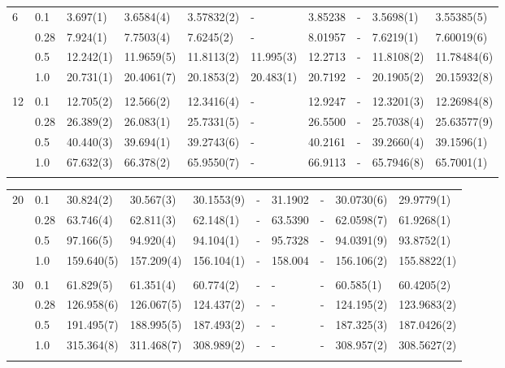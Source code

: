 {\begin{landscape}
\begin{table}
\begin{tabularx}{\hsize}{l:l|R{2.45cm}R{2.45cm}R{2.45cm}R{2.45cm}R{2.45cm}R{2.45cm}R{2.45cm}R{2.45cm}}
		6 & 0.1 & 3.697(1) & 3.6584(4) & 3.57832(2) & - & 3.85238 & - & 3.5698(1) & 3.55385(5) \\ 
		& 0.28 & 7.924(1) & 7.7503(4) & 7.6245(2) & - & 8.01957 & - & 7.6219(1) & 7.60019(6) \\
		& 0.5 & 12.242(1) & 11.9659(5) & 11.8113(2) & 11.995(3) & 12.2713 & - & 11.8108(2) & 11.78484(6) \\
		& 1.0 & 20.731(1) & 20.4061(7) & 20.1853(2) & 20.483(1) & 20.7192 & - & 20.1905(2) & 20.15932(8) \\ \hdashline \\
		
		12 & 0.1 & 12.705(2) & 12.566(2) & 12.3416(4) & - & 12.9247 & - & 12.3201(3) & 12.26984(8) \\ 
		& 0.28 & 26.389(2) & 26.083(1) & 25.7331(5) & - & 26.5500 & - & 25.7038(4) & 25.63577(9) \\
		& 0.5 & 40.440(3) & 39.694(1) & 39.2743(6) & - & 40.2161 & - & 39.2660(4) & 39.1596(1) \\
		& 1.0 & 67.632(3) & 66.378(2) & 65.9550(7) & - & 66.9113 & - & 65.7946(8) & 65.7001(1) \\ \hdashline
	\end{tabularx}
\end{table}

\begin{table}
	\begin{tabularx}{\hsize}{l:l|R{2.45cm}R{2.45cm}R{2.45cm}R{2.45cm}R{2.45cm}R{2.45cm}R{2.45cm}R{2.45cm}} \\
		\label{tab:quantumdotswinteraction2D2}
		20 & 0.1 & 30.824(2) & 30.567(3) & 30.1553(9) & - & 31.1902 & - & 30.0730(6) & 29.9779(1) \\ 
		& 0.28 & 63.746(4) & 62.811(3) & 62.148(1) & - & 63.5390 & - & 62.0598(7) & 61.9268(1) \\
		& 0.5 & 97.166(5) & 94.920(4) & 94.104(1) & - & 95.7328 & - & 94.0391(9) & 93.8752(1) \\
		& 1.0 & 159.640(5) & 157.209(4) & 156.104(1) & - & 158.004 & - & 156.106(2) & 155.8822(1) \\ \hdashline \\
		
		30 & 0.1 & 61.829(5) & 61.351(4) & 60.774(2) & - & - & - & 60.585(1) & 60.4205(2) \\ 
		& 0.28 & 126.958(6) & 126.067(5) & 124.437(2) & - & - & - & 124.195(2) & 123.9683(2) \\
		& 0.5 & 191.495(7) & 188.995(5) & 187.493(2) & - & - & - & 187.325(3) & 187.0426(2) \\
		& 1.0 & 315.364(8) & 311.468(7) & 308.989(2) & - & - & - & 308.957(2) & 308.5627(2) \\ \hdashline \\
		

\end{tabularx}
\end{table}
\end{landscape}}
